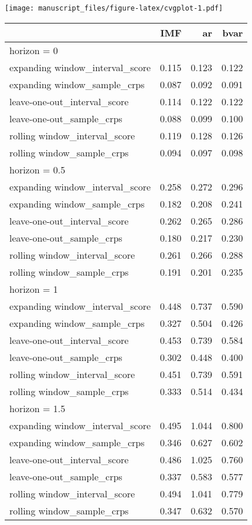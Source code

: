 \documentclass[
]{article}
\begin{document}
\texttt{[image: manuscript\_files/figure-latex/cvgplot-1.pdf]}

\newpage
\begin{longtable}{l|rrr}
\toprule
\multicolumn{1}{l}{} & IMF & ar & bvar \\ 
\midrule
\multicolumn{4}{l}{horizon = 0} \\ 
\midrule
expanding window\_interval\_score & 0.115 & 0.123 & 0.122 \\ 
expanding window\_sample\_crps & 0.087 & 0.092 & 0.091 \\ 
leave-one-out\_interval\_score & 0.114 & 0.122 & 0.122 \\ 
leave-one-out\_sample\_crps & 0.088 & 0.099 & 0.100 \\ 
rolling window\_interval\_score & 0.119 & 0.128 & 0.126 \\ 
rolling window\_sample\_crps & 0.094 & 0.097 & 0.098 \\ 
\midrule
\multicolumn{4}{l}{horizon = 0.5} \\ 
\midrule
expanding window\_interval\_score & 0.258 & 0.272 & 0.296 \\ 
expanding window\_sample\_crps & 0.182 & 0.208 & 0.241 \\ 
leave-one-out\_interval\_score & 0.262 & 0.265 & 0.286 \\ 
leave-one-out\_sample\_crps & 0.180 & 0.217 & 0.230 \\ 
rolling window\_interval\_score & 0.261 & 0.266 & 0.288 \\ 
rolling window\_sample\_crps & 0.191 & 0.201 & 0.235 \\ 
\midrule
\multicolumn{4}{l}{horizon = 1} \\ 
\midrule
expanding window\_interval\_score & 0.448 & 0.737 & 0.590 \\ 
expanding window\_sample\_crps & 0.327 & 0.504 & 0.426 \\ 
leave-one-out\_interval\_score & 0.453 & 0.739 & 0.584 \\ 
leave-one-out\_sample\_crps & 0.302 & 0.448 & 0.400 \\ 
rolling window\_interval\_score & 0.451 & 0.739 & 0.591 \\ 
rolling window\_sample\_crps & 0.333 & 0.514 & 0.434 \\ 
\midrule
\multicolumn{4}{l}{horizon = 1.5} \\ 
\midrule
expanding window\_interval\_score & 0.495 & 1.044 & 0.800 \\ 
expanding window\_sample\_crps & 0.346 & 0.627 & 0.602 \\ 
leave-one-out\_interval\_score & 0.486 & 1.025 & 0.760 \\ 
leave-one-out\_sample\_crps & 0.337 & 0.583 & 0.577 \\ 
rolling window\_interval\_score & 0.494 & 1.041 & 0.779 \\ 
rolling window\_sample\_crps & 0.347 & 0.632 & 0.570 \\ 
\bottomrule
\end{longtable}
\end{document}
